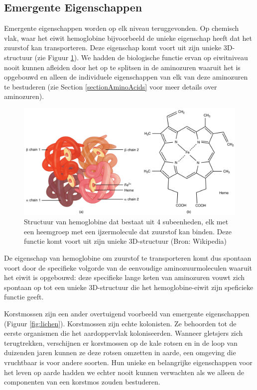 \documentclass[
  11pt,
]{book}
\begin{document}
\hypertarget{emergente-eigenschappen}{%
\subsection{Emergente Eigenschappen}\label{emergente-eigenschappen}}

Emergente eigenschappen worden op elk niveau teruggevonden. Op chemisch vlak, waar het eiwit hemoglobine bijvoorbeeld de unieke eigenschap heeft dat het zuurstof kan transporteren. Deze eigenschap komt voort uit zijn unieke 3D-structuur (zie Figuur \ref{fig:hemoglobin}). We hadden de biologische functie ervan op eiwitniveau nooit kunnen afleiden door het op te splitsen in de aminozuren waaruit het is opgebouwd en alleen de individuele eigenschappen van elk van deze aminozuren te bestuderen (zie Section \ref{sectionAminoAcids} voor meer details over aminozuren).

\begin{figure}

{\centering \includegraphics[width=1\linewidth]{./figs/hemoglobin} 

}

\caption{Structuur van hemoglobine dat bestaat uit 4 subeenheden, elk met een heemgroep met een ijzermolecule dat zuurstof kan binden. Deze functie komt voort uit zijn unieke 3D-structuur (Bron:  Wikipedia)}\label{fig:hemoglobin}
\end{figure}

De eigenschap van hemoglobine om zuurstof te transporteren komt dus spontaan voort door de specifieke volgorde van de eenvoudige aminozuurmoleculen waaruit het eiwit is opgebouwd: deze specifieke lange keten van aminozuren vouwt zich spontaan op tot een unieke 3D-structuur die het hemoglobine-eiwit zijn speficieke functie geeft.

\pagebreak

Korstmossen zijn een ander overtuigend voorbeeld van emergente eigenschappen (Figuur \ref{fig:lichen}). Korstmossen zijn echte kolonisten. Ze behoorden tot de eerste organismen die het aardoppervlak koloniseerden. Wanneer gletsjers zich terugtrekken, verschijnen er korstmossen op de kale rotsen en in de loop van duizenden jaren kunnen ze deze rotsen omzetten in aarde, een omgeving die vruchtbaar is voor andere soorten. Hun unieke en belangrijke eigenschappen voor het leven op aarde hadden we echter nooit kunnen verwachten als we alleen de componenten van een korstmos zouden bestuderen.
\end{document}
